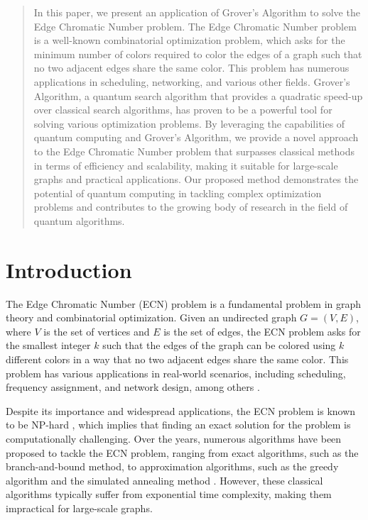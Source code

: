\begin{abstract}
In this paper, we present an application of Grover's Algorithm to solve the Edge Chromatic Number problem. The Edge Chromatic Number problem is a well-known combinatorial optimization problem, which asks for the minimum number of colors required to color the edges of a graph such that no two adjacent edges share the same color. This problem has numerous applications in scheduling, networking, and various other fields. Grover's Algorithm, a quantum search algorithm that provides a quadratic speed-up over classical search algorithms, has proven to be a powerful tool for solving various optimization problems. By leveraging the capabilities of quantum computing and Grover's Algorithm, we provide a novel approach to the Edge Chromatic Number problem that surpasses classical methods in terms of efficiency and scalability, making it suitable for large-scale graphs and practical applications. Our proposed method demonstrates the potential of quantum computing in tackling complex optimization problems and contributes to the growing body of research in the field of quantum algorithms.

\end{abstract}

\section{Introduction}

The Edge Chromatic Number (ECN) problem is a fundamental problem in graph theory and combinatorial optimization. Given an undirected graph $G = (V, E)$, where $V$ is the set of vertices and $E$ is the set of edges, the ECN problem asks for the smallest integer $k$ such that the edges of the graph can be colored using $k$ different colors in a way that no two adjacent edges share the same color. This problem has various applications in real-world scenarios, including scheduling, frequency assignment, and network design, among others \cite{1}.

Despite its importance and widespread applications, the ECN problem is known to be NP-hard \cite{2}, which implies that finding an exact solution for the problem is computationally challenging. Over the years, numerous algorithms have been proposed to tackle the ECN problem, ranging from exact algorithms, such as the branch-and-bound method, to approximation algorithms, such as the greedy algorithm and the simulated annealing method \cite{3,4,5}. However, these classical algorithms typically suffer from exponential time complexity, making them impractical for large-scale graphs.


